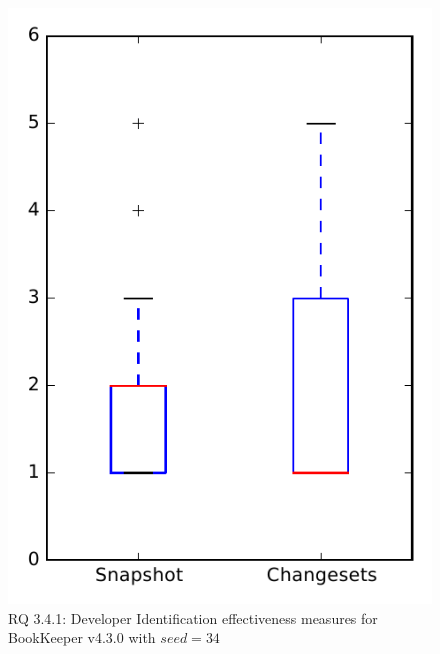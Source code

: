 
\begin{figure}
\centering
\includegraphics[height=0.4\textheight]{figures/dit_seed/rq1_bookkeeper_34}
\caption{RQ 3.4.1: Developer Identification effectiveness measures for BookKeeper v4.3.0 with $seed=34$}
\label{fig:dit_seed:rq1:bookkeeper}
\end{figure}
